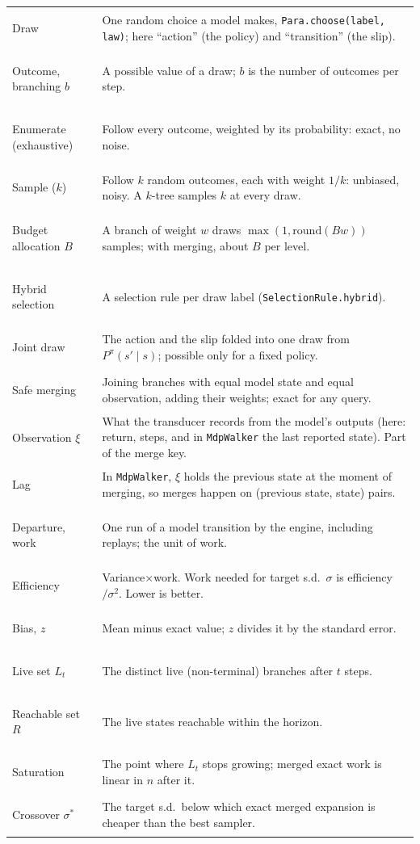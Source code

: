 \documentclass[11pt]{article}
\newcommand{\code}[1]{\texttt{#1}}
\begin{document}
\begin{tabularx}{\linewidth}{@{}>{\bfseries\raggedright\arraybackslash}p{3.4cm}Y@{}}
\toprule
Draw & One random choice a model makes, \code{Para.choose(label, law)}; here ``action'' (the policy) and
  ``transition'' (the slip).\\
Outcome, branching $b$ & A possible value of a draw; $b$ is the number of outcomes per step.\\
Enumerate (exhaustive) & Follow every outcome, weighted by its probability: exact, no noise.\\
Sample ($k$) & Follow $k$ random outcomes, each with weight $1/k$: unbiased, noisy. A $k$-tree samples $k$ at every draw.\\
Budget allocation $B$ & A branch of weight $w$ draws $\max(1,\mathrm{round}(Bw))$ samples; with merging, about $B$ per level.\\
Hybrid selection & A selection rule per draw label (\code{SelectionRule.hybrid}).\\
Joint draw & The action and the slip folded into one draw from $P^\pi(s'\mid s)$; possible only for a fixed policy.\\
Safe merging & Joining branches with equal model state and equal observation, adding their weights; exact for any query.\\
Observation $\xi$ & What the transducer records from the model's outputs (here: return, steps, and in \code{MdpWalker}
  the last reported state). Part of the merge key.\\
Lag & In \code{MdpWalker}, $\xi$ holds the previous state at the moment of merging, so merges happen on (previous state,
  state) pairs.\\
Departure, work & One run of a model transition by the engine, including replays; the unit of work.\\
Efficiency & Variance$\times$work. Work needed for target s.d.\ $\sigma$ is efficiency$/\sigma^2$. Lower is better.\\
Bias, $z$ & Mean minus exact value; $z$ divides it by the standard error.\\
Live set $L_t$ & The distinct live (non-terminal) branches after $t$ steps.\\
Reachable set $R$ & The live states reachable within the horizon.\\
Saturation & The point where $L_t$ stops growing; merged exact work is linear in $n$ after it.\\
Crossover $\sigma^*$ & The target s.d.\ below which exact merged expansion is cheaper than the best sampler.\\

\end{tabularx}
\end{document}
